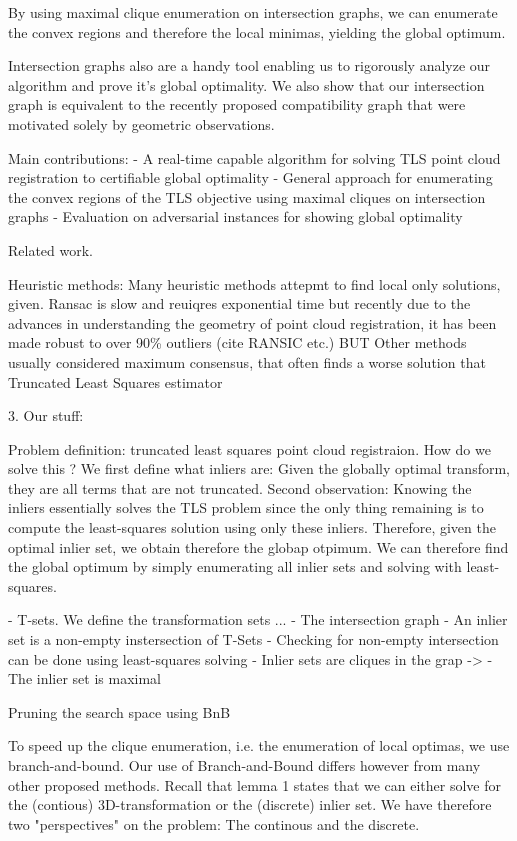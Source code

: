 By using maximal clique enumeration on intersection graphs, we can enumerate the convex regions and therefore the local minimas, yielding the global optimum. 

Intersection graphs also are a handy tool enabling us to rigorously analyze our algorithm and prove it's global optimality. We also show that our intersection graph is equivalent to the recently proposed compatibility graph that were motivated solely by geometric  observations.

Main contributions: 
- A real-time capable algorithm for solving TLS point cloud registration to certifiable global optimality 
- General approach for enumerating the convex regions of the TLS objective using maximal cliques on intersection graphs 
- Evaluation on adversarial instances for showing global optimality

Related work. 

Heuristic methods: Many heuristic methods attepmt to find local only solutions, given. 
Ransac is slow and reuiqres exponential time but recently due to the advances in understanding the geometry of point cloud registration, it has been made robust to over 90\% outliers (cite RANSIC etc.)
BUT Other methods usually considered maximum consensus, that often finds a worse solution that Truncated Least Squares estimator


3. Our stuff: 

Problem definition: truncated least squares point cloud registraion. 
How do we solve this ? We first define what inliers are: Given the globally optimal transform, they are all terms that are not truncated. 
Second observation: Knowing the inliers essentially solves the TLS problem since the only thing remaining is to compute the least-squares solution 
using only these inliers. 
Therefore, given the optimal inlier set, we obtain therefore the globap otpimum. 
We can therefore find the global optimum by simply enumerating all inlier sets and solving with least-squares. 

- T-sets. We define the transformation sets ...
- The intersection graph
- An inlier set is a non-empty instersection of T-Sets
- Checking for non-empty intersection can be done using least-squares solving
- Inlier sets are cliques in the grap -> 
- The inlier set is maximal 

Pruning the search space using BnB 

To speed up the clique enumeration, i.e. the enumeration of local optimas, we use branch-and-bound. 
Our use of Branch-and-Bound differs however from many other proposed methods. Recall that lemma 1 states that we can either solve for the (contious) 3D-transformation or the (discrete) inlier set. We have therefore two "perspectives" on the problem: The continous and the discrete.


